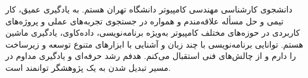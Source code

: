 

\begin{cvparagraph}

دانشجوی کارشناسی مهندسی کامپیوتر دانشگاه تهران هستم. به یادگیری عمیق، کار تیمی و حل مسأله علاقه‌مندم و همواره در جستجوی تجربه‌های عملی و پروژه‌های کاربردی در حوزه‌های مختلف کامپیوتر به‌ویژه برنامه‌نویسی، داده‌کاوی، یادگیری ماشین هستم. توانایی برنامه‌نویسی با چند زبان و آشنایی با ابزارهای متنوع توسعه و زیرساخت را دارم و از چالش‌های فنی استقبال می‌کنم. هدفم رشد حرفه‌ای و یادگیری مداوم در مسیر تبدیل شدن به یک پژوهشگر توانمند است.
\end{cvparagraph}
